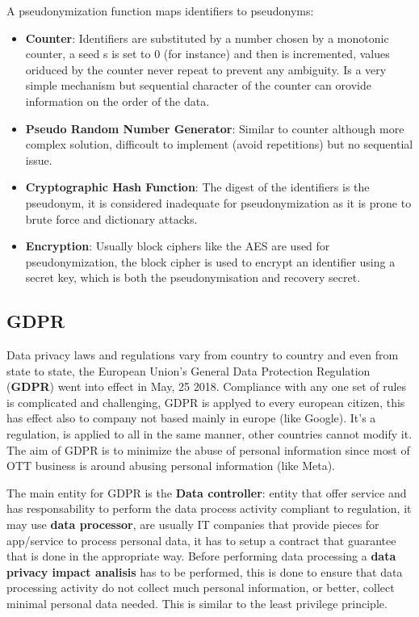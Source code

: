 A pseudonymization function maps identifiers to pseudonyms:
\begin{itemize}
    \item \textbf{Counter}: Identifiers are substituted by a number chosen by a monotonic counter, a seed s is set to 0 (for instance) and then is incremented, values oriduced by the counter never repeat to prevent any ambiguity. Is a very simple mechanism but sequential character of the counter can orovide information on the order of the data.
    \item \textbf{Pseudo Random Number Generator}: Similar to counter although more complex solution, difficoult to implement (avoid repetitions) but no sequential issue.
    \item \textbf{Cryptographic Hash Function}: The digest of the identifiers is the pseudonym, it is considered inadequate for pseudonymization as it is prone to brute force and dictionary attacks.
    \item \textbf{Encryption}: Usually block ciphers like the AES are used for pseudonymization, the block cipher is used to encrypt an identifier using a secret key, which is both the pseudonymisation and recovery secret.
\end{itemize}       

\subsection{GDPR}
Data privacy laws and regulations vary from country to country and even from state to state, the European Union's General Data Protection Regulation (\textbf{GDPR}) went into effect in May, 25 2018. Compliance with any one set of rules is complicated and challenging, GDPR is applyed  to every european citizen, this has effect also to company not based mainly in europe (like Google). It's a regulation, is applied to all in the same manner, other countries cannot modify it. The aim of GDPR is to minimize the abuse of personal information since most of OTT business is around abusing personal information (like Meta). 


The main entity for GDPR is the 
\textbf{Data controller}: entity that offer service and has responsability to perform the data process activity compliant to regulation, it may use \textbf{data processor}, are usually IT companies that provide pieces for app/service to process personal data, it has to setup a contract that guarantee that is done in the appropriate way. Before performing data processing a \textbf{data privacy impact analisis} has to be performed, this is done to ensure that data processing activity do not collect much personal information, or better, collect minimal personal data needed. This is similar to the least privilege principle.

